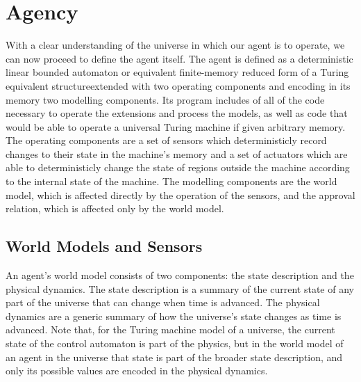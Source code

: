 \documentclass[12pt]{article}
\theoremstyle{definition}
\begin{document}

\section{Agency}
\label{sec:agents}


With a clear understanding of the universe in which our agent is to operate, we
can now proceed to define the agent itself. The agent is defined as a
deterministic linear bounded automaton or equivalent finite-memory reduced form
of a Turing equivalent structure\footnotemark extended with two operating
components and encoding in its memory two modelling components. Its program
includes of all of the code necessary to operate the extensions and process the
models, as well as code that would be able to operate a universal Turing
machine if given arbitrary memory. The operating components are a set of sensors
which deterministicly record changes to their state in the machine's memory and
a set of actuators which are able to deterministicly change the state of regions
outside the machine according to the internal state of the machine. The
modelling components are the world model, which is affected directly by the
operation of the sensors, and the approval relation, which is affected only by
the world model.


\subsection{World Models and Sensors}
\label{sec:models}

An agent's world model consists of two components: the state description and the
physical dynamics. The state description is a summary of the current state of
any part of the universe that can change when time is advanced. The physical
dynamics are a generic summary of how the universe's state changes as time is
advanced. Note that, for the Turing machine model of a universe, the current
state of the control automaton is part of the physics, but in the world model of
an agent in the universe that state is part of the broader state description,
and only its possible values are encoded in the physical dynamics.
\end{document}
